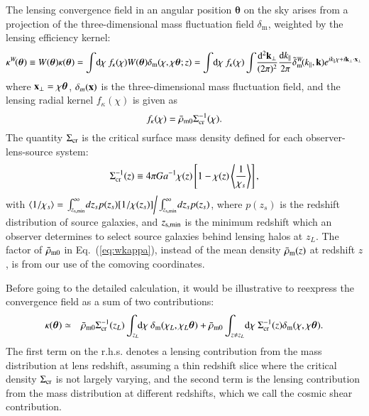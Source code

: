 \documentclass[onecolumn,notitlepage,showpacs,amsmath,amssymb,prd,floatfix]{revtex4-1}
\def\ave#1{\left\langle #1 \right\rangle}
\newcommand{\bx}{{\bf x}}
\newcommand{\bk}{{\bf k}}
\newcommand{\btheta}{{\bm{\theta}}}
\newcommand{\dr}{\mathrm{d}}
\newcommand{\deltam}{\delta_{\mathrm{m}}}
\newcommand{\sigmacri}{\Sigma_{\rm cr}^{-1}}
\newcommand{\sigmacr}{\Sigma_{\rm cr}}
\begin{document}
The lensing convergence field in an angular position $\btheta$ on the
sky arises from a projection of the three-dimensional mass fluctuation
field $\deltam$, weighted by the lensing efficiency kernel:
%
\begin{equation}
 \kappa^W\!(\btheta)\equiv W(\btheta)\kappa(\btheta)=
  \int\!\dr\chi~
 f_\kappa(\chi)W(\btheta)\deltam(\chi,\chi\btheta;z)
 =\int\!\dr\chi~
 f_\kappa(\chi)
 \int\!\frac{\dr^2\bk_\perp}{(2\pi)^2}
 \frac{\dr k_\parallel}{2\pi}\tilde{\delta}_{\rm m}^W\!(k_\parallel,\bk)e^{ik_\parallel\chi+i\bk_\perp\cdot\bx_\perp}
\label{eq:wkappa}
\end{equation}
%
where $\bx_\perp=\chi\btheta$, $\delta_m(\bx)$ is the three-dimensional
mass fluctuation field, and the lensing radial kernel $f_\kappa(\chi)$
is given as
%
\begin{equation}
 f_\kappa(\chi)=\bar{\rho}_{\rm m0} \sigmacri(\chi).
  \label{eq:fkappa}
\end{equation}
%
The quantity $\sigmacr$ is the critical surface mass density defined for
each observer-lens-source system:
%
\begin{equation}
\sigmacri(z)\equiv 4\pi Ga^{-1}\chi(z)\left[1-\chi(z)\ave{\frac{1}{\chi_s}}\right],
\end{equation}
%
with 
$\ave{1/\chi_s}=
\left.\int_{z_{\rm s,min}}^\infty\!dz_s
 p(z_s)[1/\chi(z_s)]\right/
 \int_{z_{\rm s,min}}^\infty\!dz_s p(z_s)$,
%
where $p(z_s)$ is the redshift distribution of source galaxies, and
$z_{\rm s,min}$ is the minimum redshift which an observer determines to
select source galaxies behind lensing halos at $z_L$.  The factor of
$\bar{\rho}_{\rm m0}$ in Eq.~(\ref{eq:wkappa}), instead of the mean
density $\bar{\rho}_{\rm m}(z)$ at redshift $z$, is from our use of the
comoving coordinates.

Before going to the detailed calculation, it would be illustrative to
reexpress the convergence field as a sum of two contributions:
%
\begin{eqnarray}
\kappa(\btheta)&\simeq&
 \bar{\rho}_{\rm
 m0}\sigmacri(z_L)\int_{z_L}\!\!\dr\chi~\deltam(\chi_L,\chi_L\btheta)+
\bar{\rho}_{\rm m0}\int_{z\ne z_L}\!\dr\chi~
\sigmacri(z)\deltam(\chi,\chi \btheta).
\label{eq:kappa_concept}
\end{eqnarray}
%
The first term on the r.h.s. denotes a lensing contribution from the
mass distribution at lens redshift, assuming a thin redshift slice where
the critical density $\sigmacr$ is not largely varying, and the second
term is the lensing contribution from the mass distribution at different
redshifts, which we call the cosmic shear contribution.
\end{document}
